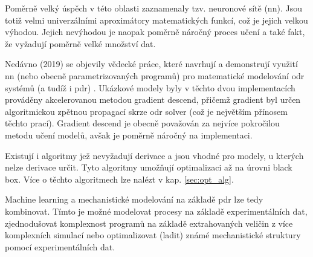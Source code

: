 Poměrně velký úspěch v této oblasti zaznamenaly tzv. neuronové sítě
(\acrshort{nn}). Jsou totiž velmi univerzálními aproximátory matematických
funkcí, což je jejich velkou výhodou. Jejich nevýhodou je naopak poměrně
náročný proces učení a také fakt, že vyžadují poměrně velké množství dat.

Nedávno (2019) se objevily vědecké práce, které navrhují a demonstrují využití
\acrshort{nn} (nebo obecně parametrizovaných programů) pro matematické
modelování \acrshort{odr} systémů (a tudíž i \acrshort{pdr})
\cite{diffEqFlux2019,chen2018neural}. Ukázkové modely byly v těchto dvou
implementacích prováděny akcelerovanou metodou gradient descend, přičemž
gradient byl určen algoritmickou zpětnou propagací skrze \acrshort{odr} solver
(což je největším přínosem těchto prací). Gradient descend je obecně považován
za nejvíce pokročilou metodu učení modelů, avšak je poměrně náročný na
implementaci.

Existují i algoritmy jež nevyžadují derivace a jsou vhodné pro modely, u
kterých nelze derivace určit. Tyto algoritmy umožňují optimalizaci až na úrovni
black box. Více o těchto algoritmech lze nalézt v kap. \ref{sec:opt_alg}.

Machine learning a mechanistické modelování na základě \acrshort{pdr} lze tedy
kombinovat. Tímto je možné modelovat procesy na základě experimentálních dat,
zjednodušovat komplexnost programů na základě extrahovaných veličin z více
komplexních simulací nebo optimalizovat (ladit) známé mechanistické struktury
pomocí experimentálních dat.

